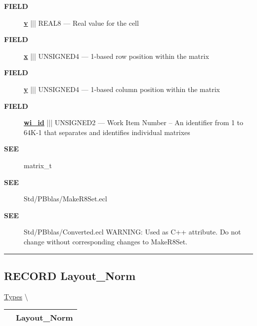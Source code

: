 \par
\begin{description}
\item [\colorbox{tagtype}{\color{white} \textbf{\textsf{FIELD}}}] \textbf{\underline{v}} ||| REAL8 --- Real value for the cell
\item [\colorbox{tagtype}{\color{white} \textbf{\textsf{FIELD}}}] \textbf{\underline{x}} ||| UNSIGNED4 --- 1-based row position within the matrix
\item [\colorbox{tagtype}{\color{white} \textbf{\textsf{FIELD}}}] \textbf{\underline{y}} ||| UNSIGNED4 --- 1-based column position within the matrix
\item [\colorbox{tagtype}{\color{white} \textbf{\textsf{FIELD}}}] \textbf{\underline{wi\_id}} ||| UNSIGNED2 --- Work Item Number -- An identifier from 1 to 64K-1 that separates and identifies individual matrixes
\end{description}








\par
\begin{description}
\item [\colorbox{tagtype}{\color{white} \textbf{\textsf{SEE}}}] matrix\_t
\item [\colorbox{tagtype}{\color{white} \textbf{\textsf{SEE}}}] Std/PBblas/MakeR8Set.ecl
\item [\colorbox{tagtype}{\color{white} \textbf{\textsf{SEE}}}] Std/PBblas/Converted.ecl WARNING: Used as C++ attribute. Do not change without corresponding changes to MakeR8Set.
\end{description}



\rule{\linewidth}{0.5pt}
\subsection*{\textsf{\colorbox{headtoc}{\color{white} RECORD}
Layout\_Norm}}

\hypertarget{ecldoc:pbblas.types.layout_norm}{}
\hspace{0pt} \hyperlink{ecldoc:PBblas.Types}{Types} \textbackslash 

{\renewcommand{\arraystretch}{1.5}
\begin{tabularx}{\textwidth}{|>{\raggedright\arraybackslash}l|X|}
\hline
\hspace{0pt}\mytexttt{\color{red} } & \textbf{Layout\_Norm} \\
\hline
\end{tabularx}
}

